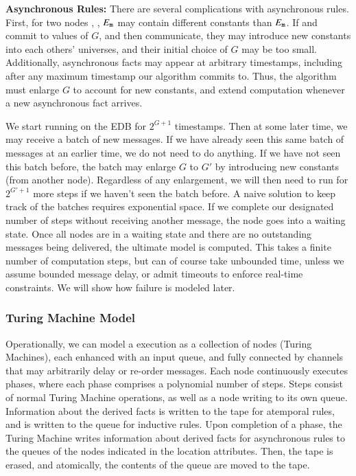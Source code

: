 \vspace{1em}
{\bf Asynchronous Rules:}
There are several complications with asynchronous rules.  First, for two nodes , , $E_{\text{\dedalus{{\scriptsize m}}}}$ may contain different constants than $E_{\text{\dedalus{{\scriptsize m}}}}$.  If  and  commit to values of $G$, and then communicate, they may introduce new constants into each others' universes, and their initial choice of $G$ may be too small.  Additionally, asynchronous facts may appear at arbitrary timestamps, including after any maximum timestamp our algorithm commits to.  Thus, the algorithm must enlarge $G$ to account for new constants, and extend computation whenever a new asynchronous fact arrives.

We start running on the EDB for $2^{G+1}$ timestamps.  Then at some later time, we may receive a batch of new messages.  If we have already seen this same batch of messages at an earlier time, we do not need to do anything.  If we have not seen this batch before, the batch may enlarge $G$ to $G'$ by introducing new constants (from another node).  Regardless of any enlargement, we will then need to run for $2^{G'+1}$ more steps if we haven't seen the batch before.  A naive solution to keep track of the batches requires exponential space.  If we complete our designated number of steps without receiving another message, the node goes into a waiting state.  Once all nodes are in a waiting state and there are no outstanding messages being delivered, the ultimate model is computed.  This takes a finite number of computation steps, but can of course take unbounded time, unless we assume bounded message delay, or admit timeouts to enforce real-time constraints.  We will show how failure is modeled later.

\subsubsection{Turing Machine Model}

Operationally, we can model a \lang execution as a collection of nodes (Turing Machines), each enhanced with an input queue, and fully connected by channels that may arbitrarily delay or re-order messages.  Each node continuously executes phases, where each phase comprises a polynomial number of steps.  Steps consist of normal Turing Machine operations, as well as a node writing to its own queue.  Information about the derived facts is written to the tape for atemporal rules, and is written to the queue for inductive rules.  Upon completion of a phase, the Turing Machine writes information about derived facts for asynchronous rules to the queues of the nodes indicated in the location attributes.  Then, the tape is erased, and atomically, the contents of the queue are moved to the tape.

